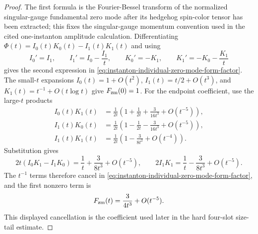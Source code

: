 \begin{proof}
The first formula is the Fourier-Bessel transform of the normalized
singular-gauge fundamental zero mode after its hedgehog spin-color tensor has
been extracted; this fixes the singular-gauge momentum convention used in the
cited one-instanton amplitude calculation.  Differentiating
\(\Phi(t)=I_0(t)K_0(t)-I_1(t)K_1(t)\) and using
\[
  I_0'=I_1,\qquad
  I_1'=I_0-\frac{I_1}{t},\qquad
  K_0'=-K_1,\qquad
  K_1'=-K_0-\frac{K_1}{t}
\]
gives the second expression in
\eqref{eq:instanton-individual-zero-mode-form-factor}.  The small-\(t\)
expansions \(I_0(t)=1+O(t^2)\), \(I_1(t)=t/2+O(t^3)\), and
\(K_1(t)=t^{-1}+O(t\log t)\) give \(F_{\rm zm}(0)=1\).  For the endpoint
coefficient, use the large-\(t\) products
\[
\begin{aligned}
  I_0(t)K_1(t)
  &=
  \frac1{2t}
  \left(1+\frac1{2t}+\frac{3}{16t^3}+O(t^{-5})\right),\\
  I_1(t)K_0(t)
  &=
  \frac1{2t}
  \left(1-\frac1{2t}-\frac{3}{16t^3}+O(t^{-5})\right),\\
  I_1(t)K_1(t)
  &=
  \frac1{2t}
  \left(1-\frac{3}{8t^2}+O(t^{-4})\right).
\end{aligned}
\]
Substitution gives
\[
  2t(I_0K_1-I_1K_0)
  =
  \frac1t+\frac{3}{8t^3}+O(t^{-5}),
  \qquad
  2I_1K_1
  =
  \frac1t-\frac{3}{8t^3}+O(t^{-5}).
\]
The \(t^{-1}\) terms therefore cancel in
\eqref{eq:instanton-individual-zero-mode-form-factor}, and the first nonzero
term is
\[
  F_{\rm zm}(t)=\frac{3}{4t^3}+O(t^{-5}) .
\]
This displayed cancellation is the coefficient used later in the hard
four-slot size-tail estimate.
\end{proof}

